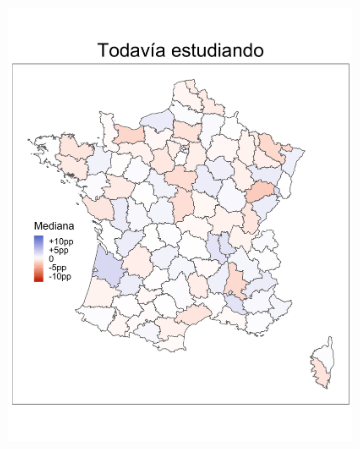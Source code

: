 \begin{figure}
	\centering
	\begin{subfigure}{0.275\textwidth}
	\includegraphics[width = \textwidth]{Figs/Efectos/Mapa_Efectos_Esc_Modelo_H}
	\end{subfigure}
	~
	\begin{subfigure}{0.275\textwidth}

\end{subfigure}
\end{figure}
